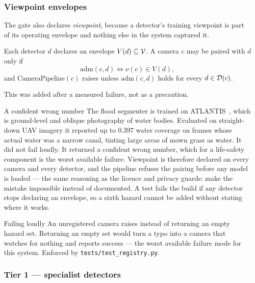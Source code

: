 \subsubsection{Viewpoint envelopes}
\label{sec:viewpoint}

The gate also declares \emph{viewpoint}, because a detector's training
viewpoint is part of its operating envelope and nothing else in the system
captured it.

\begin{definition}[Admissibility]
\label{def:admissible}
Each detector $d$ declares an envelope $V(d) \subseteq \mathcal{V}$. A camera
$c$ may be paired with $d$ only if
\[
  \mathrm{adm}(c, d) \iff \nu(c) \in V(d),
\]
and $\mathrm{CameraPipeline}(c)$ raises unless
$\mathrm{adm}(c,d)$ holds for every $d \in \mathcal{D}(c)$.
\end{definition}

This was added after a measured failure, not as a precaution.

\begin{recorded}{A confident wrong number}
The flood segmenter is trained on ATLANTIS~\citep{erfani2022atlantis}, which
is ground-level and oblique photography of water bodies. Evaluated on
straight-down UAV imagery it reported up to $0.397$ water coverage on frames
whose actual water was a narrow canal, tinting large areas of mown grass as
water. It did not fail loudly. It returned a confident wrong number, which for
a life-safety component is the worst available failure. Viewpoint is therefore
declared on every camera and every detector, and the pipeline refuses the
pairing before any model is loaded — the same reasoning as the licence and
privacy guards: make the mistake impossible instead of documented. A test
fails the build if any detector stops declaring an envelope, so a sixth hazard
cannot be added without stating where it works.
\end{recorded}

\begin{recorded}{Failing loudly}
An unregistered camera raises instead of returning an empty hazard set.
Returning an empty set would turn a typo into a camera that watches for
nothing and reports success — the worst available failure mode for this
system. Enforced by \texttt{tests/test\_registry.py}.
\end{recorded}

\subsubsection{Tier 1 — specialist detectors}

